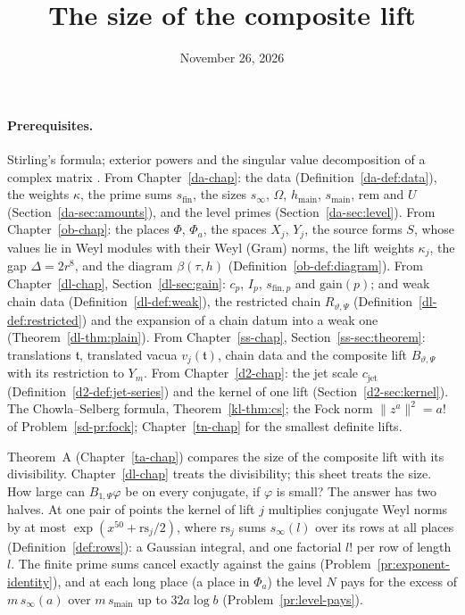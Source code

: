 \documentclass[reqno]{amsart}
\title{The size of the composite lift}
\author{}
\date{November 26, 2026}
\newcounter{chap}
\theoremstyle{definition}
\theoremstyle{plain}
\theoremstyle{remark}
\newcommand{\gain}{\mathrm{gain}}
\newcommand{\rem}{\mathrm{rem}}
\newcommand{\hm}{h_{\mathrm{main}}}
\newcommand{\sinf}{s_\infty}
\newcommand{\sfin}{s_{\mathrm{fin}}}
\newcommand{\sfp}{s_{\mathrm{fin},p}}
\newcommand{\smain}{s_{\mathrm{main}}}
\newcommand{\tr}{\mathfrak t}
\newcommand{\rs}{\mathrm{rs}}
\begin{document}
\maketitle
{}\label{chap}

\paragraph{Prerequisites.}
Stirling's formula; exterior powers and the singular value decomposition of a complex matrix \cite[\S2.6]{HJ}.  From Chapter~\ref{da-chap}: the data (Definition~\ref{da-def:data}), the weights \(\kappa\), the prime sums \(\sfin\), the sizes \(\sinf\), \(\Omega\), \(\hm\), \(\smain\), \(\rem\) and \(U\) (Section~\ref{da-sec:amounts}), and the level primes (Section~\ref{da-sec:level}).  From Chapter~\ref{ob-chap}: the places \(\Phi\), \(\Phi_a\), the spaces \(X_j\), \(Y_j\), the source forms \(S\), whose values lie in Weyl modules with their Weyl (Gram) norms, the lift weights \(\kappa_j\), the gap \(\Delta = 2r^8\), and the diagram \(\beta(\tau, h)\) (Definition~\ref{ob-def:diagram}).  From Chapter~\ref{dl-chap}, Section~\ref{dl-sec:gain}: \(c_p\), \(I_p\), \(\sfp\) and \(\gain(p)\); and weak chain data (Definition~\ref{dl-def:weak}), the restricted chain \(R_{\vartheta,\Psi}\) (Definition~\ref{dl-def:restricted}) and the expansion of a chain datum into a weak one (Theorem~\ref{dl-thm:plain}).  From Chapter~\ref{ss-chap}, Section~\ref{ss-sec:theorem}: translations \(\tr\), translated vacua \(v_j(\tr)\), chain data and the composite lift \(B_{\vartheta,\Psi}\) with its restriction to \(Y_m\).  From Chapter~\ref{d2-chap}: the jet scale \(c_{\mathrm{jet}}\) (Definition~\ref{d2-def:jet-series}) and the kernel of one lift (Section~\ref{d2-sec:kernel}).  The Chowla--Selberg formula, Theorem~\ref{kl-thm:cs}; the Fock norm \(\lVert z^a\rVert^2 = a!\) of Problem~\ref{sd-pr:fock}; Chapter~\ref{tn-chap} for the smallest definite lifts.

\medskip
Theorem~A (Chapter~\ref{ta-chap}) compares the size of the composite lift with its divisibility.  Chapter~\ref{dl-chap} treats the divisibility; this sheet treats the size.  How large can \(B_{1,\Psi}\varphi\) be on every conjugate, if \(\varphi\) is small?  The answer has two halves.  At one pair of points the kernel of lift \(j\) multiplies conjugate Weyl norms by at most \(\exp(x^{50} + \rs_j/2)\), where \(\rs_j\) sums \(\sinf(l)\) over its rows at all places (Definition~\ref{def:rows}): a Gaussian integral, and one factorial \(l!\) per row of length \(l\).  The finite prime sums cancel exactly against the gains (Problem~\ref{pr:exponent-identity}), and at each long place (a place in \(\Phi_a\)) the level \(N\) pays for the excess of \(m\,\sinf(a)\) over \(m\,\smain\) up to \(32a\log b\) (Problem~\ref{pr:level-pays}).
\end{document}
